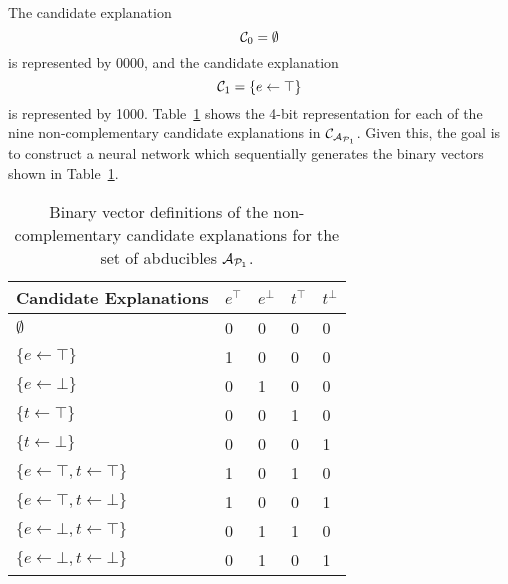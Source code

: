 The candidate explanation
\[
\mathcal{C}_0 = \emptyset
\]
is represented by 0000, and the candidate explanation
\[
\mathcal{C}_1 = \{e \leftarrow \top\}
\]
is represented by 1000. Table~\ref{table:4bitsvector} shows the 4-bit representation for each of the nine non-complementary candidate explanations in $\mathcal{C}_{\mathcal{A}_{\mathcal{P}_1}}$. Given this, the goal is to construct a neural network which sequentially generates the binary vectors shown in Table~\ref{table:4bitsvector}.

\begin{table}
\centering
\begin{tabular}{l|llll}
Candidate Explanations & $e^\top$ & $e^\bot$ & $t^\top$ & $t^\bot$\\
\hline
$\emptyset$ & 0 & 0 & 0 & 0 \\
$\{e \leftarrow \top \}$ & 1 & 0 & 0 & 0 \\
$\{e \leftarrow \bot \}$ & 0 & 1 & 0 & 0 \\
$\{t \leftarrow \top \}$ & 0 & 0 & 1 & 0 \\
$\{t \leftarrow \bot \}$ & 0 & 0 & 0 & 1 \\
$\{e \leftarrow \top,  t \leftarrow \top\}$ & 1 & 0 & 1 & 0 \\
$\{e \leftarrow \top,  t \leftarrow \bot\}$ & 1 & 0 & 0 & 1 \\
$\{e \leftarrow \bot,  t \leftarrow \top\}$ & 0 & 1 & 1 & 0 \\
$\{e \leftarrow \bot,  t \leftarrow \bot\}$ & 0 & 1 & 0 & 1\\
\end{tabular}
\bigskip
\caption{Binary vector definitions of the non-complementary candidate explanations for the set of abducibles $\mathcal{A}_{\mathcal{P}_1}$.}
\label{table:4bitsvector}
\end{table}

